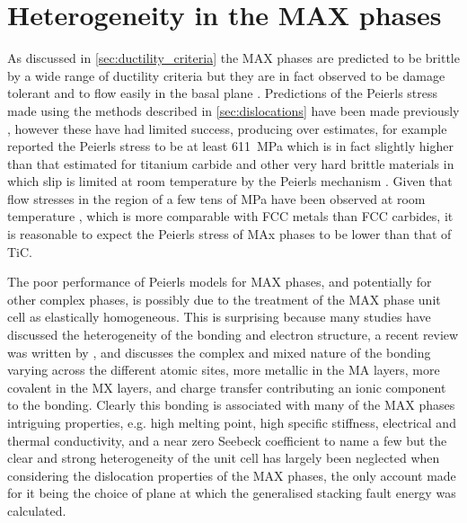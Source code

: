 \chapter{Heterogeneity in the MAX phases}
\label{chap:hetero_max_phases}

\graphicspath{{hetero_max_phases/Figs/}}


As  discussed in \autoref{sec:ductility_criteria} the MAX phases are predicted to be brittle by a wide range of ductility criteria but they are in fact observed to be damage tolerant and to flow easily in the basal plane \cite{Barsoum1999}.
Predictions of the Peierls stress made using the methods described in \autoref{sec:dislocations} have been made previously \cite{Music2007ductility,Gouriet2015}, however these have had limited success, producing over estimates, for example \citet{Gouriet2015} reported the Peierls stress to be at least \SI{611}{\mega\pascal} which is in fact slightly higher than that estimated for titanium carbide and other very hard brittle materials in which slip is limited at room temperature by the Peierls mechanism \cite{Chang1966,Clegg2006,Kamimura2011,Yadav2014}. Given that flow stresses in the region of a few tens of \si{\mega\pascal} have been observed at room temperature \cite{Humphrey2012,Barsoum1999}, which is more comparable with FCC metals than FCC carbides, it is reasonable to expect the Peierls stress of MAx phases to be lower than that of TiC.

The poor performance of Peierls models for MAX phases, and potentially for other complex phases, is possibly due to the treatment of the MAX phase unit cell as elastically homogeneous. This is surprising because many studies have discussed the heterogeneity of the bonding and electron structure, a recent review was written by \citet{Magnuson2017}, and discusses the complex and mixed nature of the bonding varying across the different atomic sites, more metallic in the MA layers, more covalent in the MX layers, and charge transfer contributing an ionic component to the bonding. Clearly this bonding is associated with many of the MAX phases intriguing properties, e.g. high melting point, high specific stiffness, electrical and thermal conductivity, and a near zero Seebeck coefficient to name a few \cite{Yoo2000,Sun2011,Magnuson2017} but the clear and strong heterogeneity of the unit cell has largely been neglected when considering the dislocation properties of the MAX phases, the only account made for it being the choice of plane at which the generalised stacking fault energy was calculated.


